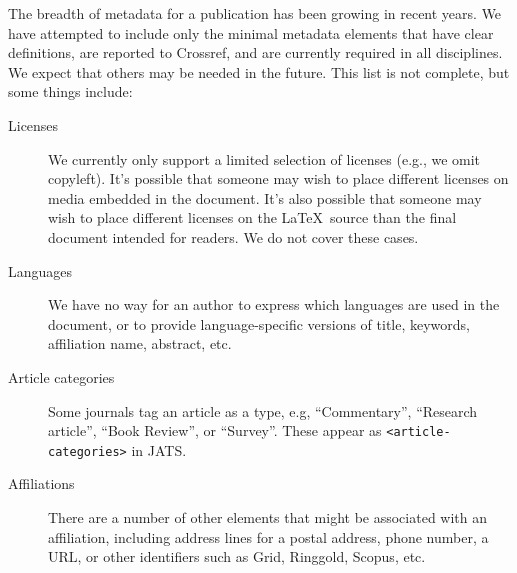 \documentclass{article}
\begin{document}
The breadth of metadata for a publication has been growing in recent
years.  We have attempted to include only the minimal metadata
elements that have clear definitions, are reported to Crossref, and
are currently required in all disciplines.  We expect that
others may be needed in the future. This list is not complete, but
some things include:
\begin{description}
\item[Licenses] We currently only support a limited selection of licenses (e.g., we omit
copyleft). It's possible that someone may wish to place different licenses on media embedded
in the document. It's also possible that someone may wish to place different licenses on the \LaTeX\ source
than the final document intended for readers. We do not cover these cases.
\item[Languages] We have no way for an author to express which languages are used in the document,
or to provide language-specific versions of title, keywords, affiliation name, abstract, etc.
\item[Article categories] Some journals tag an article as a type, e.g, ``Commentary'', ``Research article'',
``Book Review'', or ``Survey''. These appear as \texttt{\textless{article-categories}\textgreater} in JATS.
\item[Affiliations] There are a number of other elements that might be associated with an affiliation,
including address lines for a postal address, phone number, a URL, or other identifiers such as
Grid, Ringgold, Scopus, etc.


\end{description}
\end{document}
